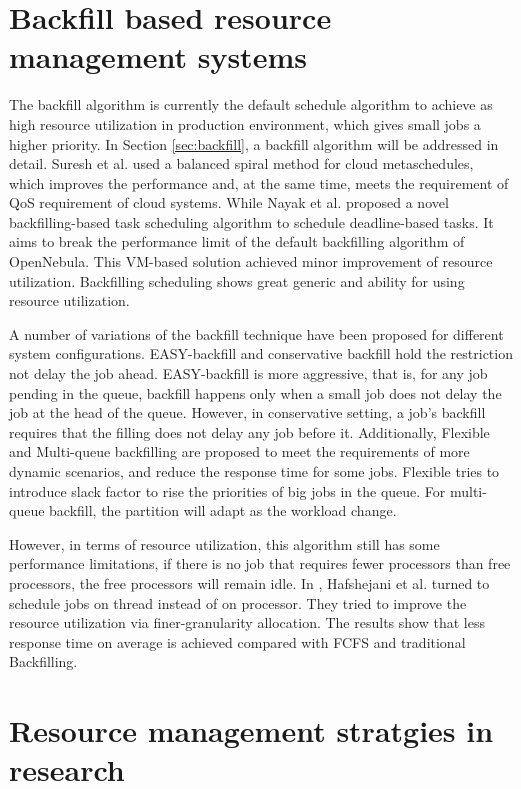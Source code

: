 \section{Backfill based resource management systems}
The backfill algorithm is currently the default schedule algorithm to achieve as high resource utilization  in production environment, which gives small jobs a higher priority. 
In Section \ref{sec:backfill}, a backfill algorithm will be addressed in detail. 
Suresh et al. used a balanced spiral method for cloud metaschedules\cite{5972255}, which improves the performance and, at the same time, meets the requirement of QoS requirement of cloud systems.  
While Nayak et al. proposed a novel backfilling-based task scheduling algorithm to schedule deadline-based tasks\cite{nayak2019dynamic}. 
It aims to break the performance limit of the default backfilling algorithm of OpenNebula. 
This VM-based solution achieved minor improvement of resource utilization. 
Backfilling scheduling shows great generic and ability for using resource utilization.

A number of variations of the backfill technique have been proposed for different system configurations.
EASY-backfill and conservative backfill hold the restriction not delay the job ahead\cite{4797220}.
EASY-backfill is more aggressive, that is, for any job pending in the queue, backfill happens only when a small job does not delay the job at the head of the queue. 
However, in conservative setting, a job’s backfill requires that the filling does not delay any job before it. 
Additionally, Flexible\cite{talby1999supporting} and Multi-queue backfilling\cite{lawson2002multiple} are proposed to meet the requirements of more dynamic scenarios, and reduce the response time for some jobs. 
Flexible tries to introduce slack factor to rise the priorities of big jobs in the queue. For multi-queue backfill, the partition will adapt as the workload change.

However, in terms of resource utilization, this algorithm still has some performance limitations, if there is no job that requires fewer processors than free processors, the free processors will remain idle. 
In \cite{hafshejani2013efficient}, Hafshejani et al. turned to schedule jobs on thread instead of on processor. 
They tried to improve the resource utilization via finer-granularity allocation. 
The results show that less response time on average is achieved compared with FCFS and traditional Backfilling.
 
\section{Resource management stratgies in research}
